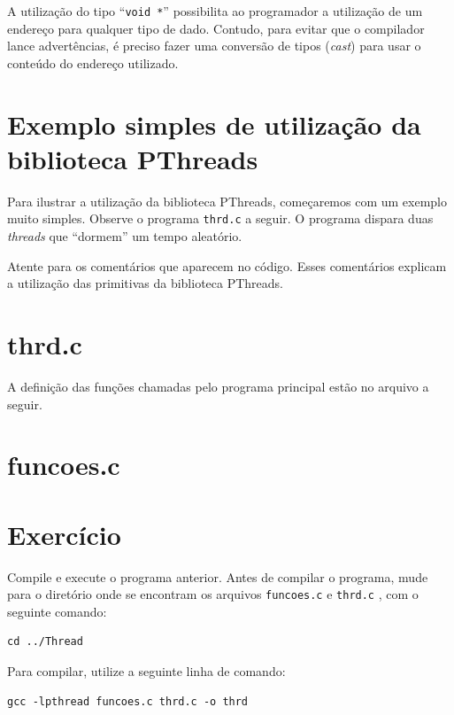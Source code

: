 A utilização do tipo \enquote{\mbox{\texttt{void *}}} possibilita ao programador a utilização de um endereço para qualquer tipo de dado. Contudo, para evitar que o compilador lance advertências, é preciso fazer uma conversão de tipos (\textit{cast}) para usar o conteúdo do endereço utilizado.

\section{Exemplo simples de utilização da biblioteca PThreads}
Para ilustrar a utilização da biblioteca PThreads, começaremos com um exemplo muito simples. Observe o programa \texttt{thrd.c} a seguir. O programa dispara duas \textit{threads} que \enquote{dormem} um tempo aleatório. 

Atente para os comentários que aparecem no código. Esses comentários explicam a utilização das primitivas da biblioteca PThreads.

\section*{thrd.c}


A definição das funções chamadas pelo programa principal estão no arquivo a seguir.

\section*{funcoes.c}




\section{Exercício}
Compile e execute o programa anterior. Antes de compilar o programa, mude para o diretório onde se encontram os arquivos \texttt{funcoes.c} e \texttt{thrd.c} , com o seguinte comando:

\begin{lstlisting}[style=MyBashStyle]
cd ../Thread
\end{lstlisting}

Para compilar, utilize a seguinte linha de comando:

\begin{lstlisting}[style=MyBashStyle]
gcc -lpthread funcoes.c thrd.c -o thrd
\end{lstlisting}

